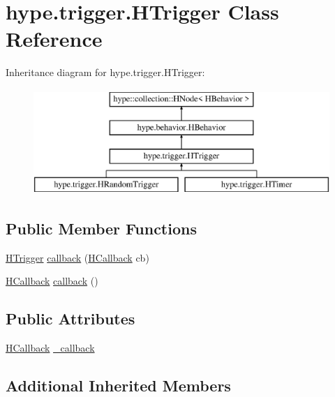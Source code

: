 \hypertarget{classhype_1_1trigger_1_1_h_trigger}{\section{hype.\-trigger.\-H\-Trigger Class Reference}
\label{classhype_1_1trigger_1_1_h_trigger}
}
Inheritance diagram for hype.\-trigger.\-H\-Trigger\-:\begin{figure}[H]
\begin{center}
\leavevmode
\includegraphics[height=4.000000cm]{classhype_1_1trigger_1_1_h_trigger}
\end{center}
\end{figure}
\subsection*{Public Member Functions}
\begin{DoxyCompactItemize}
\item 
\hyperlink{classhype_1_1trigger_1_1_h_trigger}{H\-Trigger} \hyperlink{classhype_1_1trigger_1_1_h_trigger_a0f0688ac8240a2faea6c39424d158bae}{callback} (\hyperlink{interfacehype_1_1interfaces_1_1_h_callback}{H\-Callback} cb)
\item 
\hyperlink{interfacehype_1_1interfaces_1_1_h_callback}{H\-Callback} \hyperlink{classhype_1_1trigger_1_1_h_trigger_adc7385d467a6206470fe61088376b91f}{callback} ()
\end{DoxyCompactItemize}
\subsection*{Public Attributes}
\begin{DoxyCompactItemize}
\item 
\hyperlink{interfacehype_1_1interfaces_1_1_h_callback}{H\-Callback} \hyperlink{classhype_1_1trigger_1_1_h_trigger_a30a0463d5963b8889e47a9de32c09af8}{\-\_\-callback}
\end{DoxyCompactItemize}
\subsection*{Additional Inherited Members}


